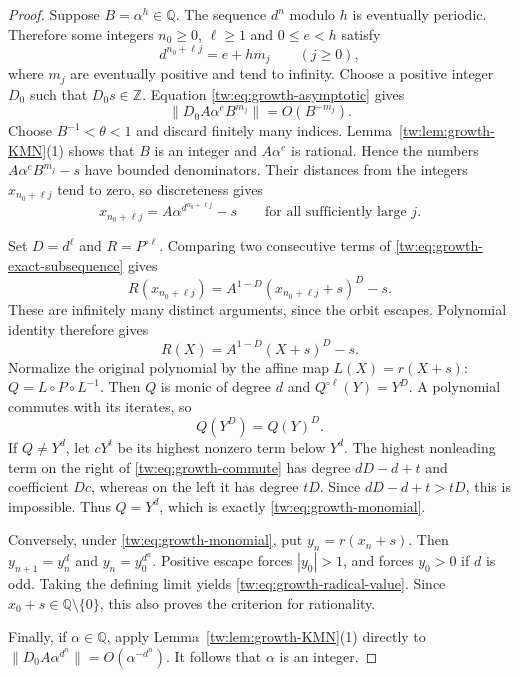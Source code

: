 \documentclass[11pt,a4paper]{article}
\theoremstyle{definition}
\theoremstyle{remark}
\numberwithin{equation}{section}
\begin{document}
\begin{proof}
Suppose $B=\alpha^h\in\mathbb Q$.  The sequence $d^n$ modulo $h$ is
eventually periodic.  Therefore some integers $n_0\ge0$, $\ell\ge1$
and $0\le e<h$ satisfy
\[
 d^{n_0+\ell j}=e+hm_j\qquad(j\ge0),
\]
where $m_j$ are eventually positive and tend to infinity.
Choose a positive integer $D_0$ such that $D_0s\in\mathbb Z$.
Equation \eqref{tw:eq:growth-asymptotic} gives
\[
 \left\|D_0A\alpha^e B^{m_j}\right\|=O(B^{-m_j}).
\]
Choose $B^{-1}<\theta<1$ and discard finitely many indices.
Lemma~\ref{tw:lem:growth-KMN}(1) shows that $B$ is an integer and
$A\alpha^e$ is rational.  Hence the numbers
$A\alpha^eB^{m_j}-s$ have bounded denominators.  Their distances
from the integers $x_{n_0+\ell j}$ tend to zero, so discreteness gives
\begin{equation}\label{tw:eq:growth-exact-subsequence}
 x_{n_0+\ell j}=A\alpha^{d^{n_0+\ell j}}-s
 \qquad\text{for all sufficiently large }j.
\end{equation}

Set $D=d^\ell$ and $R=P^{\circ\ell}$.  Comparing two consecutive
terms of \eqref{tw:eq:growth-exact-subsequence} gives
\[
 R(x_{n_0+\ell j})=A^{1-D}(x_{n_0+\ell j}+s)^D-s.
\]
These are infinitely many distinct arguments, since the orbit escapes.
Polynomial identity therefore gives
\[
 R(X)=A^{1-D}(X+s)^D-s.
\]
Normalize the original polynomial by the affine map $L(X)=r(X+s)$:
$Q=L\circ P\circ L^{-1}$.  Then $Q$ is monic of degree $d$ and
$Q^{\circ\ell}(Y)=Y^D$.  A polynomial commutes with its iterates,
so
\begin{equation}\label{tw:eq:growth-commute}
 Q(Y^D)=Q(Y)^D.
\end{equation}
If $Q\ne Y^d$, let $cY^t$ be its highest nonzero term below $Y^d$.
The highest nonleading term on the right of
\eqref{tw:eq:growth-commute} has degree $dD-d+t$ and coefficient $Dc$,
whereas on the left it has degree $tD$.
Since $dD-d+t>tD$, this is impossible.  Thus $Q=Y^d$, which is
exactly \eqref{tw:eq:growth-monomial}.

Conversely, under \eqref{tw:eq:growth-monomial}, put $y_n=r(x_n+s)$.
Then $y_{n+1}=y_n^d$ and $y_n=y_0^{d^n}$.
Positive escape forces $|y_0|>1$, and forces $y_0>0$ if $d$ is odd.
Taking the defining limit yields \eqref{tw:eq:growth-radical-value}.
Since $x_0+s\in\mathbb Q\setminus\{0\}$, this also proves the
criterion for rationality.

Finally, if $\alpha\in\mathbb Q$, apply
Lemma~\ref{tw:lem:growth-KMN}(1) directly to
$\|D_0A\alpha^{d^n}\|=O(\alpha^{-d^n})$.
It follows that $\alpha$ is an integer.
\end{proof}
\end{document}
